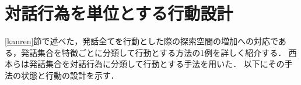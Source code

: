 \documentclass[12pt,a4paper,twoside,openany]{jbook}
\begin{document}

\section{対話行為を単位とする行動設計}\label{baseline2}
\ref{kanren}節で述べた，発話全てを行動とした際の探索空間の増加への対応である，発話集合を特徴ごとに分類して行動とする方法の1例を詳しく紹介する．
西本ら\cite{nishimoto2}は発話集合を対話行為に分類して行動とする手法を用いた．
以下にその手法の状態と行動の設計を示す．
\end{document}
